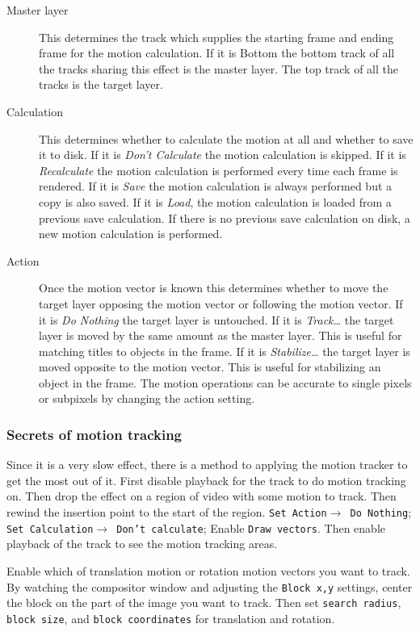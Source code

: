 \begin{description}
    \item[Master layer] This determines the track which supplies the starting frame and ending frame for the motion calculation. If it is Bottom the bottom track of all the tracks sharing this effect is the master layer. The top track of all the tracks is the target layer.
    \item[Calculation] This determines whether to calculate the motion at all and whether to save it to disk. If it is \textit{Don't Calculate} the motion calculation is skipped. If it is \textit{Recalculate} the motion calculation is performed every time each frame is rendered. If it is \textit{Save} the motion calculation is always performed but a copy is also saved. If it is \textit{Load}, the motion calculation is loaded from a previous save calculation. If there is no previous save calculation on disk, a new motion calculation is performed.
    \item[Action] Once the motion vector is known this determines whether to move the target layer opposing the motion vector or following the motion vector. If it is \textit{Do Nothing} the target layer is untouched. If it is \textit{Track\dots} the target layer is moved by the same amount as the master layer. This is useful for matching titles to objects in the frame. If it is \textit{Stabilize\dots} the target layer is moved opposite to the motion vector. This is useful for stabilizing an object in the frame. The motion operations can be accurate to single pixels or subpixels by changing the action setting.
\end{description}

\subsubsection*{Secrets of motion tracking}
\label{ssub:secrets_motion_tracking}

Since it is a very slow effect, there is a method to applying the motion tracker to get the most out of it. First disable playback for the track to do motion tracking on. Then drop the effect on a region of video with some motion to track. Then rewind the insertion point to the start of the region. \texttt{Set Action$\rightarrow$ Do Nothing}; \texttt{Set Calculation$\rightarrow$ Don't calculate}; Enable \texttt{Draw vectors}. Then enable playback of the track to see the motion tracking areas.

Enable which of translation motion or rotation motion vectors you want to track. By watching the compositor window and adjusting the \texttt{Block x,y} settings, center the block on the part of the image you want to track. Then set \texttt{search radius}, \texttt{block size}, and \texttt{block coordinates} for translation and rotation.

